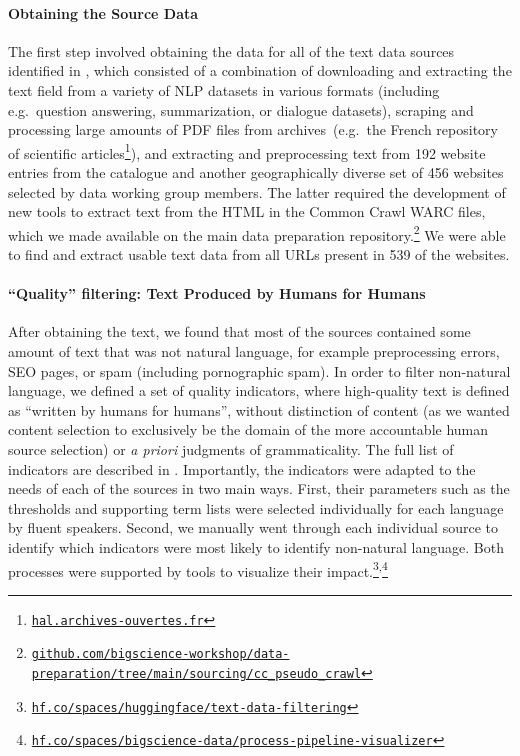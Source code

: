 \documentclass[twoside,11pt]{article}
\begin{document}
\paragraph{Obtaining the Source Data} 
The first step involved obtaining the data for all of the text data sources identified in , which consisted of a combination of downloading and extracting the text field from a variety of NLP datasets in various formats (including e.g.\ question answering, summarization, or dialogue datasets), scraping and processing large amounts of PDF files from archives~(e.g.\ the French repository of scientific articles\footnote{\href{https://hal.archives-ouvertes.fr/}{\texttt{hal.archives-ouvertes.fr}}}), and extracting and preprocessing text from 192 website entries from the catalogue and another geographically diverse set of 456 websites selected by data working group members. The latter required the development of new tools to extract text from the HTML in the Common Crawl WARC files, which we made available on the main data preparation repository.\footnote{ \href{https://github.com/bigscience-workshop/data-preparation/tree/main/sourcing/cc_pseudo_crawl}{\texttt{github.com/bigscience-workshop/data-preparation/tree/main/sourcing/cc\_pseudo\_crawl}}} We were able to find and extract usable text data from all URLs present in 539 of the websites.

\paragraph{``Quality'' filtering: Text Produced by Humans for Humans} After obtaining the text, we found that most of the sources contained some amount of text that was not natural language, for example preprocessing errors, SEO pages, or spam (including pornographic spam). In order to filter non-natural language, we defined a set of quality indicators, where high-quality text is defined as ``written by humans for humans'', without distinction of content (as we wanted content selection to exclusively be the domain of the more accountable human source selection) or \textit{a priori} judgments of grammaticality. The full list of indicators are described in  \citep{laurencon2022bigscience}. Importantly, the indicators were adapted to the needs of each of the sources in two main ways. First, their parameters such as the thresholds and supporting term lists were selected individually for each language by fluent speakers. Second, we manually went through each individual source to identify which indicators were most likely to identify non-natural language. Both processes were supported by tools to visualize their impact.\footnote{\href{https://hf.co/spaces/huggingface/text-data-filtering}{\texttt{hf.co/spaces/huggingface/text-data-filtering}}}\textsuperscript{,}\footnote{\href{https://hf.co/spaces/bigscience-data/process-pipeline-visualizer}{\texttt{hf.co/spaces/bigscience-data/process-pipeline-visualizer}}}
\end{document}
